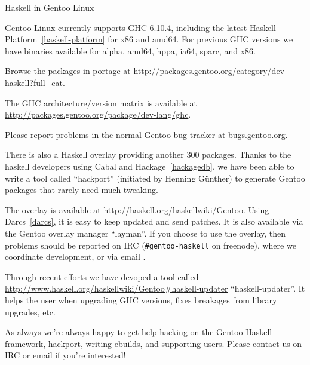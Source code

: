 \begin{hcarentry}[updated]{Haskell in Gentoo Linux}
\label{gentoo}
\makeheader

Gentoo Linux currently supports GHC 6.10.4, including the
latest Haskell Platform~\cref{haskell-platform} for x86 and amd64.
For previous GHC versions we have binaries available for alpha, amd64, hppa,
ia64, sparc, and x86.

Browse the packages in portage at 
\url{http://packages.gentoo.org/category/dev-haskell?full\_cat}.

The GHC architecture/version matrix is available at
\url{http://packages.gentoo.org/package/dev-lang/ghc}.

Please report problems in the normal Gentoo bug tracker
at \url{bugs.gentoo.org}.

There is also a Haskell overlay providing another 300 packages. Thanks to
the haskell developers using Cabal and Hackage~\cref{hackagedb}, we have been
able to write a tool called ``hackport'' (initiated by Henning G\"unther) to
generate Gentoo packages that rarely need much tweaking.

The overlay is available at
\url{http://haskell.org/haskellwiki/Gentoo}. Using
Darcs~\cref{darcs}, it is easy to keep updated and send patches.
It is also available via the Gentoo overlay manager ``layman''.
If you choose to use the overlay, then problems should be
reported on
IRC (\verb+#gentoo-haskell+ on freenode), where we coordinate
development, or via email .

Through recent efforts we have devoped a tool called
\url{http://www.haskell.org/haskellwiki/Gentoo#haskell-updater}
``haskell-updater''. It helps the user when upgrading GHC versions, fixes
breakages from library upgrades, etc.

As always we're always happy to get help hacking on the Gentoo Haskell
framework, hackport, writing ebuilds, and supporting users. Please contact
us on IRC or email if you're interested!
\end{hcarentry}
